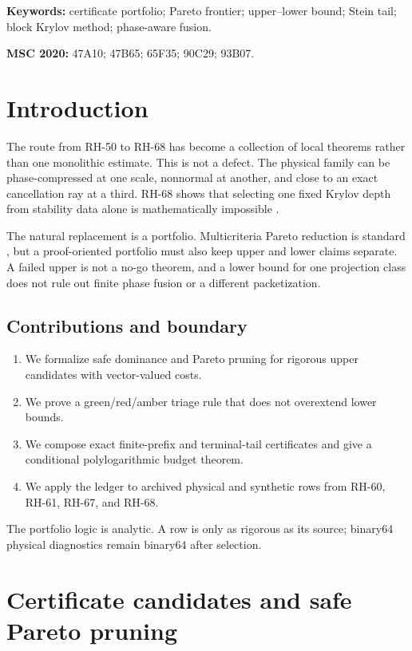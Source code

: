 \documentclass[11pt]{article}
\theoremstyle{definition}
\begin{document}
\noindent\textbf{Keywords:} certificate portfolio; Pareto frontier;
upper--lower bound; Stein tail; block Krylov method; phase-aware fusion.

\medskip
\noindent\textbf{MSC 2020:} 47A10; 47B65; 65F35; 90C29; 93B07.

\section{Introduction}

The route from RH-50 to RH-68 has become a collection of local theorems
rather than one monolithic estimate.  This is not a defect.  The physical
family can be phase-compressed at one scale, nonnormal at another, and close
to an exact cancellation ray at a third.  RH-68 shows that selecting one
fixed Krylov depth from stability data alone is mathematically impossible
\citep{WangDepthBarrier2026}.

The natural replacement is a portfolio.  Multicriteria Pareto reduction is
standard \citep{Ehrgott2005}, but a proof-oriented portfolio must also keep
upper and lower claims separate.  A failed upper is not a no-go theorem, and
a lower bound for one projection class does not rule out finite phase fusion
or a different packetization.

\subsection*{Contributions and boundary}

\begin{enumerate}[leftmargin=2.2em]
 \item We formalize safe dominance and Pareto pruning for rigorous upper
       candidates with vector-valued costs.
 \item We prove a green/red/amber triage rule that does not overextend lower
       bounds.
 \item We compose exact finite-prefix and terminal-tail certificates and give
       a conditional polylogarithmic budget theorem.
 \item We apply the ledger to archived physical and synthetic rows from
       RH-60, RH-61, RH-67, and RH-68.
\end{enumerate}

The portfolio logic is analytic.  A row is only as rigorous as its source;
binary64 physical diagnostics remain binary64 after selection.

\section{Certificate candidates and safe Pareto pruning}
\label{sec:pareto}
\end{document}
